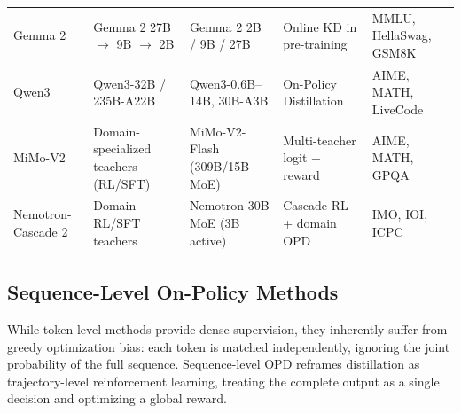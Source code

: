\documentclass{article} %
\begin{document}
\begin{table}[t]
{\begin{tabular}{@{}lllll@{}}
        Gemma 2 \citep{2408.00118} & Gemma 2 27B $\to$ 9B $\to$ 2B & Gemma 2 2B / 9B / 27B & Online KD in pre-training & MMLU, HellaSwag, GSM8K \\
        Qwen3 \citep{2505.09388} & Qwen3-32B / 235B-A22B & Qwen3-0.6B--14B, 30B-A3B & On-Policy Distillation & AIME, MATH, LiveCode \\
        MiMo-V2 \citep{2601.02780} & Domain-specialized teachers (RL/SFT) & MiMo-V2-Flash (309B/15B MoE) & Multi-teacher logit + reward & AIME, MATH, GPQA \\
        
        Nemotron-Cascade 2 \citep{2603.19220} & Domain RL/SFT teachers & Nemotron 30B MoE (3B active) & Cascade RL + domain OPD & IMO, IOI, ICPC \\
                \bottomrule
    \end{tabular}
    }
\end{table}


\subsection{Sequence-Level On-Policy Methods}
\label{subsec:sequence_level}

While token-level methods provide dense supervision, they inherently suffer from greedy optimization bias: each token is matched independently, ignoring the joint probability of the full sequence. Sequence-level OPD reframes distillation as trajectory-level reinforcement learning, treating the complete output as a single decision and optimizing a global reward.
\end{document}
